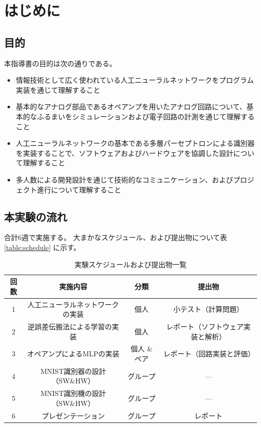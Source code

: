 \chapter{はじめに}

\section{目的}

本指導書の目的は次の通りである。

\begin{itemize}
    \item 情報技術として広く使われている人工ニューラルネットワークをプログラム実装を通じて理解すること
    \item 基本的なアナログ部品であるオペアンプを用いたアナログ回路について、基本的なふるまいをシミュレーションおよび電子回路の計測を通じて理解すること
    \item 人工ニューラルネットワークの基本である多層パーセプトロンによる識別器を実装することで、ソフトウェアおよびハードウェアを協調した設計について理解すること
    \item 多人数による開発設計を通じて技術的なコミュニケーション、およびプロジェクト進行について理解すること
\end{itemize}

\section{本実験の流れ}

合計6週で実施する。
大まかなスケジュール、および提出物について表 \ref{table:schedule} に示す。

\begin{table}[htbp]
  \centering
  \caption{実験スケジュールおよび提出物一覧}
  \label{tab:schedule}
  \vspace{0.5em}
  \begin{tabular}{|c||c|c|c|}
    \toprule
    \textbf{回数} & \textbf{実施内容} & \textbf{分類} & \textbf{提出物} \\
    \midrule
    1 & 人工ニューラルネットワークの実装 & 個人 & 小テスト（計算問題） \\
    2 & 逆誤差伝搬法による学習の実装 & 個人 & レポート\newline（ソフトウェア実装と解析） \\
    3 & オペアンプによるMLPの実装 & 個人 \& ペア & レポート\newline（回路実装と評価） \\
    4 & MNIST識別器の設計（SW\&HW） & グループ & --- \\
    5 & MNIST識別機の設計（SW\&HW） & グループ & --- \\
    6 & プレゼンテーション & グループ & レポート \\
    \bottomrule
  \end{tabular}
\end{table}